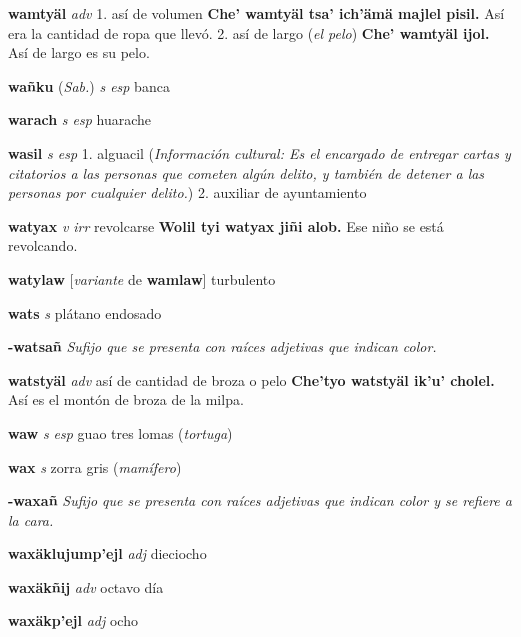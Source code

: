 \documentclass[10pt]{scrbook}
\newcommand{\entry}[1]{\textbf{#1}}
\newcommand{\onedefinition}[1]{#1.}
\newcommand{\nontranslationdef}[1]{\textit{#1}}
\newcommand{\partofspeech}[1]{\textit{#1}}
\newcommand{\spanishtranslation}[1]{#1}
\newcommand{\clarification}[1]{(\textit{#1})}
\newcommand{\cholexample}[1]{\textbf{#1}}
\newcommand{\exampletranslation}[1]{#1}
\newcommand{\relevantdialect}[1]{(\textit{#1})}
\newcommand{\culturalinformation}[1]{(\textit{#1})}
\newcommand{\conjugationtense}[1]{[\textit{#1}}
\newcommand{\conjugationverb}[1]{de \textbf{#1}]}
\begin{document}
\begin{multicols}{2}
\entry{wamtyäl}
\partofspeech{adv}
\onedefinition{1}
\spanishtranslation{así de volumen}
\cholexample{Che' wamtyäl tsa' ich'ämä majlel pisil.}
\exampletranslation{Así era la cantidad de ropa que llevó.}
\onedefinition{2}
\spanishtranslation{así de largo}
\clarification{el pelo}
\cholexample{Che' wamtyäl ijol.}
\exampletranslation{Así de largo es su pelo.}

\entry{wañku}
\relevantdialect{Sab.}
\partofspeech{s esp}
\spanishtranslation{banca}

\entry{warach}
\partofspeech{s esp}
\spanishtranslation{huarache}

\entry{wasil}
\partofspeech{s esp}
\onedefinition{1}
\spanishtranslation{alguacil}
\culturalinformation{Información cultural: Es el encargado de entregar cartas y citatorios a las personas que cometen algún delito, y también de detener a las personas por cualquier delito.}
\onedefinition{2}
\spanishtranslation{auxiliar de ayuntamiento}

\entry{watyax}
\partofspeech{v irr}
\spanishtranslation{revolcarse}
\cholexample{Wolil tyi watyax jiñi alob.}
\exampletranslation{Ese niño se está revolcando.}

\entry{watylaw}
\conjugationtense{variante}
\conjugationverb{wamlaw}
\spanishtranslation{turbulento}

\entry{wats}
\partofspeech{s}
\spanishtranslation{plátano endosado}

\entry{-watsañ}
\nontranslationdef{Sufijo que se presenta con raíces adjetivas que indican color.}

\entry{watstyäl}
\partofspeech{adv}
\spanishtranslation{así de cantidad de broza o pelo}
\cholexample{Che'tyo watstyäl ik'u' cholel.}
\exampletranslation{Así es el montón de broza de la milpa.}

\entry{waw}
\partofspeech{s esp}
\spanishtranslation{guao}
\spanishtranslation{tres lomas}
\clarification{tortuga}

\entry{wax}
\partofspeech{s}
\spanishtranslation{zorra gris}
\clarification{mamífero}

\entry{-waxañ}
\nontranslationdef{Sufijo que se presenta con raíces adjetivas que indican color y se refiere a la cara.}

\entry{waxäklujump'ejl}
\partofspeech{adj}
\spanishtranslation{dieciocho}

\entry{waxäkñij}
\partofspeech{adv}
\spanishtranslation{octavo día}

\entry{waxäkp'ejl}
\partofspeech{adj}
\spanishtranslation{ocho}


\end{multicols}
\end{document}
